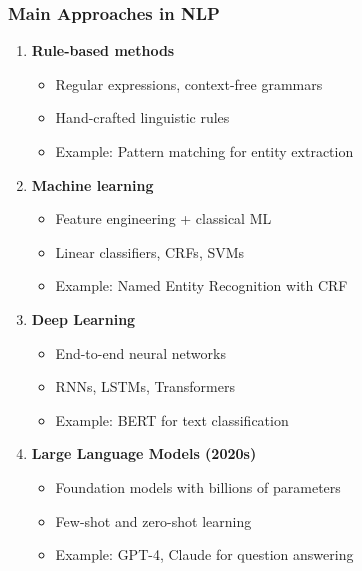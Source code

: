 \begin{frame}[fragile]\frametitle{Main Approaches in NLP}
\begin{enumerate}
\item \textbf{Rule-based methods}
\begin{itemize}
\item Regular expressions, context-free grammars
\item Hand-crafted linguistic rules
\item Example: Pattern matching for entity extraction
\end{itemize}
\item \textbf{Machine learning}
\begin{itemize}
\item Feature engineering + classical ML
\item Linear classifiers, CRFs, SVMs
\item Example: Named Entity Recognition with CRF
\end{itemize}
\item \textbf{Deep Learning}
\begin{itemize}
\item End-to-end neural networks
\item RNNs, LSTMs, Transformers
\item Example: BERT for text classification
\end{itemize}
\item \textbf{Large Language Models (2020s)}
\begin{itemize}
\item Foundation models with billions of parameters
\item Few-shot and zero-shot learning
\item Example: GPT-4, Claude for question answering
\end{itemize}
\end{enumerate}
\end{frame}

